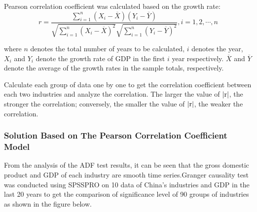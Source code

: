 \documentclass[12pt]{article}  %
\begin{document}
	Pearson correlation coefficient was calculated based on the growth rate:
	\begin{equation}
	r = \frac{{\sum\limits_{i = 1}^n {({X_i} - \overline X )({Y_i} - \overline Y )} }}{{\sqrt {{{\sum\limits_{i = 1}^n {({X_i} - \overline X )} }^2}} \sqrt {{{\sum\limits_{i = 1}^n {({Y_i} - \overline Y )} }^2}} }} , i = 1, 2, \cdots, n 
	\end{equation}

	where $n$ denotes the total number of years to be calculated, $i$  denotes the year, $X_i$ and $Y_i$ denote the growth rate of GDP in the first $i$ year respectively. $\overline{X}$ and $\overline{Y}$ denote the average of the growth rates in the sample totals, respectively. 
	
	Calculate each group of data one by one to get the correlation coefficient between each two industries and analyze the correlation. The larger the value of  $\left| {\rm{r}} \right|$, the stronger the correlation; conversely, the smaller the value of $\left| {\rm{r}} \right|$, the weaker the correlation.
	

\subsubsection{Solution Based on The Pearson Correlation Coefficient Model} %
From the analysis of the ADF test results, it can be seen that the gross domestic product and GDP of each industry are smooth time series.Granger causality test was conducted using SPSSPRO on 10 data of China's industries and GDP in the last 20 years to get the comparison of significance level of 90 groups of industries as shown in the figure below.
\end{document}
